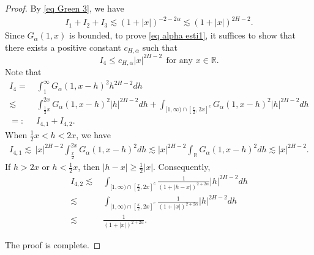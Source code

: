 \documentclass[11pt,reqno]{amsart}
\numberwithin{equation}{section}
\newcommand{\1}{{\bf 1}}
\newcommand{\2}{{\bf 2}}
\begin{document}
\begin{proof}
By \eqref{eq Green 3}, we have
\begin{align}
I_1+ I_2+I_3 \lesssim (1+|x|)^{-2-2\alpha} \lesssim (1+|x|)^{2H-2}.
\end{align}
Since  $G_{\alpha}(1, x)$ is bounded,   
to prove \eqref{eq alpha esti1}, it suffices to show that there exists a positive constant $c_{H,\alpha}$ such that 
  \begin{equation}\label{eq midd1}
  I_4\le c_{H,\alpha} |x|^{2H-2} \ \   \text{for  any } x\in \mathbb R. 
   \end{equation}
     Note that 
\begin{align*}
I_4= &\,  \int_1^{\infty}  G_{\alpha}(1,x-h)^2 h^{2H-2}dh\\
 \lesssim &\,    \int_{\frac12x}^{2x}G_{\alpha}(1,x-h)^2 |h|^{2H-2}dh+\int_{[1,\infty)\cap[\frac{x}{2},2x]^c}G_{\alpha}(1,x-h)^2 |h|^{2H-2}dh\\
 =: &\,  I_{4,1}+I_{4,2}.
\end{align*}
When  $\frac12x<h<2x$,   we have
\begin{align*}
I_{4,1} \lesssim \, |x|^{2H-2}\int_{\frac{x}{2}}^{2x} G_{\alpha}(1,x -h)^2dh\lesssim |x|^{2H-2}\int_{\mathbb{R}} G_{\alpha}(1,x-h)^2dh\lesssim |x|^{2H-2}.
\end{align*}
If $h>2x$ or $h<\frac12x$, then $|h-x|\ge \frac12|x|$. Consequently,
\begin{align*}
I_{4,2} \lesssim&\, \int_{[1,\infty)\cap[\frac{x}{2},2x]^c}\frac{1}{(1+|h-x|)^{2+2\alpha}} |h|^{2H-2}dh \\
 \lesssim&\, \int_{[1,\infty)\cap[\frac{x}{2},2x]^c}\frac{1}{(1+|x|)^{2+2\alpha}} |h|^{2H-2}dh \\
 \lesssim&\, \frac{1}{(1+|x|)^{2+2\alpha}}.
\end{align*} 
 
 The proof is complete.
\end{proof}
\end{document}
